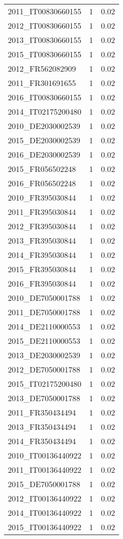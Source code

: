 \begin{table*}[htbp]
\begin{tabular}{lrr}
2011_IT00830660155 & 1 & 0.02 \\
2012_IT00830660155 & 1 & 0.02 \\
2013_IT00830660155 & 1 & 0.02 \\
2015_IT00830660155 & 1 & 0.02 \\
2012_FR562082909 & 1 & 0.02 \\
2011_FR301691655 & 1 & 0.02 \\
2016_IT00830660155 & 1 & 0.02 \\
2014_IT02175200480 & 1 & 0.02 \\
2010_DE2030002539 & 1 & 0.02 \\
2015_DE2030002539 & 1 & 0.02 \\
2016_DE2030002539 & 1 & 0.02 \\
2015_FR056502248 & 1 & 0.02 \\
2016_FR056502248 & 1 & 0.02 \\
2010_FR395030844 & 1 & 0.02 \\
2011_FR395030844 & 1 & 0.02 \\
2012_FR395030844 & 1 & 0.02 \\
2013_FR395030844 & 1 & 0.02 \\
2014_FR395030844 & 1 & 0.02 \\
2015_FR395030844 & 1 & 0.02 \\
2016_FR395030844 & 1 & 0.02 \\
2010_DE7050001788 & 1 & 0.02 \\
2011_DE7050001788 & 1 & 0.02 \\
2014_DE2110000553 & 1 & 0.02 \\
2015_DE2110000553 & 1 & 0.02 \\
2013_DE2030002539 & 1 & 0.02 \\
2012_DE7050001788 & 1 & 0.02 \\
2015_IT02175200480 & 1 & 0.02 \\
2013_DE7050001788 & 1 & 0.02 \\
2011_FR350434494 & 1 & 0.02 \\
2013_FR350434494 & 1 & 0.02 \\
2014_FR350434494 & 1 & 0.02 \\
2010_IT00136440922 & 1 & 0.02 \\
2011_IT00136440922 & 1 & 0.02 \\
2015_DE7050001788 & 1 & 0.02 \\
2012_IT00136440922 & 1 & 0.02 \\
2014_IT00136440922 & 1 & 0.02 \\
2015_IT00136440922 & 1 & 0.02 \\

\end{tabular}
\end{table*}

